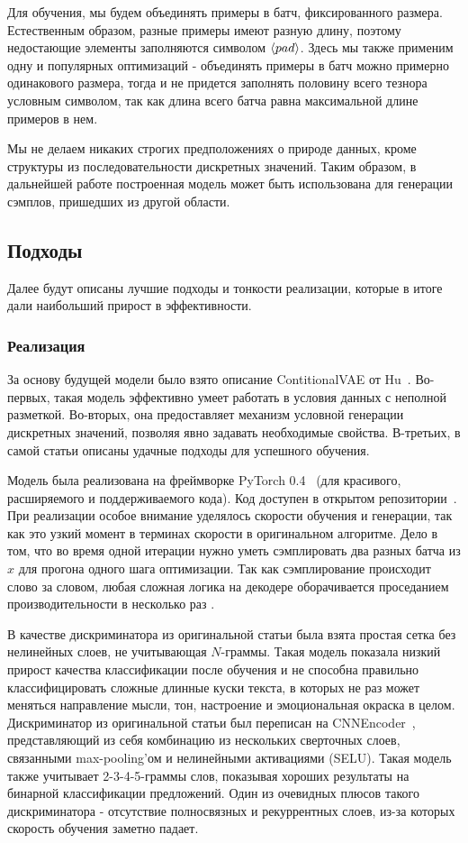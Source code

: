 \documentclass{spbau-diploma}
\begin{document}
Для обучения, мы будем объединять примеры в батч, фиксированного размера. 
Естественным образом, разные примеры имеют разную длину, поэтому недостающие
элементы заполняются символом $\langle pad \rangle$. Здесь мы также применим одну и популярных 
оптимизаций - объединять примеры в батч можно примерно одинакового размера, 
тогда и не придется заполнять половину всего тезнора условным символом, так как 
длина всего батча равна максимальной длине примеров в нем.

Мы не делаем никаких строгих предположениях о природе данных, кроме структуры из
последовательности дискретных значений. Таким образом, в дальнейшей работе 
построенная модель может быть использована для генерации сэмплов, пришедших из
другой области.

\subsection{Подходы}
Далее будут описаны лучшие подходы и тонкости реализации, которые в итоге дали
наибольший прирост в эффективности.

\subsubsection{Реализация}
За основу будущей модели было взято описание ContitionalVAE от 
Hu~\cite{text_cvae}. Во-первых, такая модель эффективно умеет работать в 
условия данных с неполной разметкой. Во-вторых, она предоставляет механизм
условной генерации дискретных значений, позволяя явно задавать необходимые 
свойства. В-третьих, в самой статьи описаны удачные подходы для успешного 
обучения.

Модель была реализована на фреймворке PyTorch 0.4~\cite{pytorch} (для 
красивого, расширяемого и поддерживаемого кода). Код доступен в открытом 
репозитории~\cite{github}. При реализации особое внимание уделялось скорости 
обучения и генерации, так как это узкий момент в терминах скорости в 
оригинальном алгоритме. Дело в том, что во время одной итерации
нужно уметь сэмплировать два разных батча из $x$ для прогона одного шага 
оптимизации. Так как сэмплирование происходит слово за словом, любая сложная 
логика на декодере оборачивается проседанием производительности в несколько раз
.

В качестве дискриминатора из оригинальной статьи была взята простая сетка без
нелинейных слоев, не учитывающая $N$-граммы. Такая модель показала низкий 
прирост качества классификации после обучения и не способна правильно 
классифицировать сложные длинные куски текста, в которых не раз может меняться
направление мысли, тон, настроение и эмоциональная окраска в целом.
Дискриминатор из оригинальной статьи был переписан на 
CNNEncoder~\cite{1510.03820}, представляющий из себя комбинацию из нескольких 
сверточных слоев, связанными max-pooling'ом и нелинейными активациями (SELU). 
Такая модель также учитывает 2-3-4-5-граммы слов, показывая хороших результаты 
на бинарной классификации предложений. Один из очевидных плюсов такого 
дискриминатора - отсутствие полносвязных и рекуррентных слоев, из-за которых 
скорость обучения заметно падает.
\end{document}
